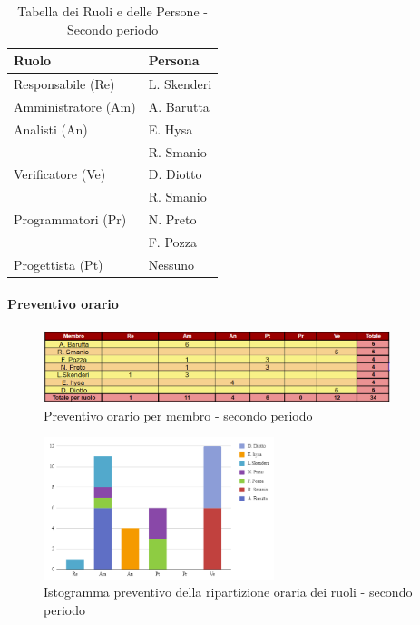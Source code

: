 \begin{table}[H]
    \centering
    \begin{tabular}{|l|l|}
    \hline
    \textbf{Ruolo} & \textbf{Persona} \\
    \hline
    \hline
    Responsabile (Re) & L. Skenderi \\
    \hline
    Amministratore (Am) & A. Barutta \\
    \hline
    Analisti (An) & E. Hysa \\
     & R. Smanio \\
     \hline
    Verificatore (Ve) & D. Diotto \\
     & R. Smanio \\
     \hline
    Programmatori (Pr) & N. Preto \\
     & F. Pozza \\
     \hline
    Progettista (Pt) & Nessuno \\
    \hline
    \end{tabular}
    \caption{Tabella dei Ruoli e delle Persone - Secondo periodo}
    \label{tab:Ruoli_persone_2}
    \end{table}
    

\paragraph*{Preventivo orario} \hspace{1pt}

\begin{figure}[H]
    \centering
    \includegraphics[width=0.9\textwidth]{../Images/preventivoOrario2Periodo.png}
    \caption{Preventivo orario per membro - secondo periodo}
    \label{fig:Preventivo_orario_2}
\end{figure}

\begin{figure}[H]
    \centering
    \includegraphics[width=0.6\textwidth]{../Images/preventivoDivisioneRuoli2Periodo.png}
    \caption{Istogramma preventivo della ripartizione oraria dei ruoli - secondo periodo}
    \label{fig:Preventivo_ripartizione_oraria_2}
\end{figure}

